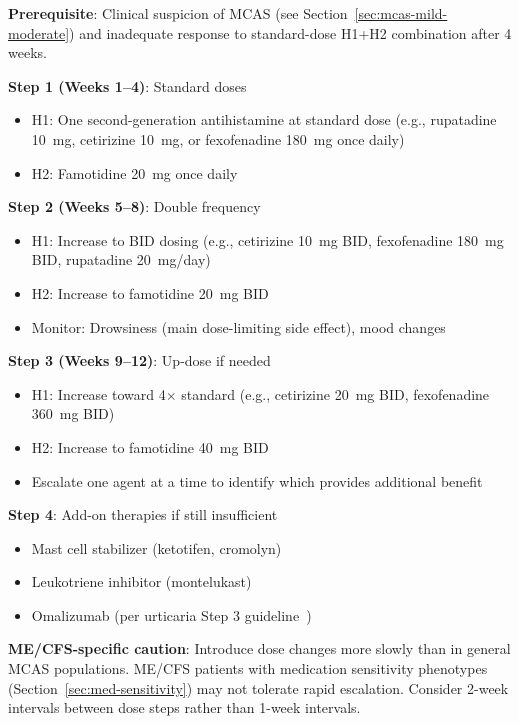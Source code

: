 \begin{protocol}
\label{prot:mcas-updosing}

\textbf{Prerequisite}: Clinical suspicion of MCAS (see Section~\ref{sec:mcas-mild-moderate}) and inadequate response to standard-dose H1+H2 combination after 4 weeks.

\textbf{Step 1 (Weeks 1--4)}: Standard doses
\begin{itemize}
    \item H1: One second-generation antihistamine at standard dose (e.g., rupatadine 10~mg, cetirizine 10~mg, or fexofenadine 180~mg once daily)
    \item H2: Famotidine 20~mg once daily
\end{itemize}

\textbf{Step 2 (Weeks 5--8)}: Double frequency
\begin{itemize}
    \item H1: Increase to BID dosing (e.g., cetirizine 10~mg BID, fexofenadine 180~mg BID, rupatadine 20~mg/day)
    \item H2: Increase to famotidine 20~mg BID
    \item Monitor: Drowsiness (main dose-limiting side effect), mood changes
\end{itemize}

\textbf{Step 3 (Weeks 9--12)}: Up-dose if needed
\begin{itemize}
    \item H1: Increase toward 4$\times$ standard (e.g., cetirizine 20~mg BID, fexofenadine 360~mg BID)
    \item H2: Increase to famotidine 40~mg BID
    \item Escalate one agent at a time to identify which provides additional benefit
\end{itemize}

\textbf{Step 4}: Add-on therapies if still insufficient
\begin{itemize}
    \item Mast cell stabilizer (ketotifen, cromolyn)
    \item Leukotriene inhibitor (montelukast)
    \item Omalizumab (per urticaria Step 3 guideline~\cite{Zuberbier2022urticaria})
\end{itemize}

\textbf{ME/CFS-specific caution}: Introduce dose changes more slowly than in general MCAS populations. ME/CFS patients with medication sensitivity phenotypes (Section~\ref{sec:med-sensitivity}) may not tolerate rapid escalation. Consider 2-week intervals between dose steps rather than 1-week intervals.

\end{protocol}

